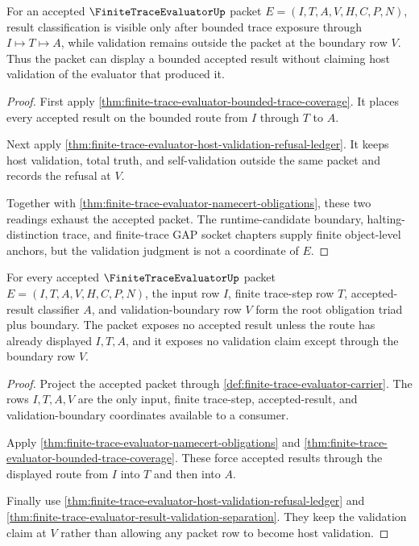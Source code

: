 \begin{theorem}
\label{thm:finite-trace-evaluator-result-validation-separation}
For an accepted $\FiniteTraceEvaluatorUp$ packet
$E=(I,T,A,V,H,C,P,N)$, result classification is visible only after bounded trace exposure through $I \longmapsto T \longmapsto A$, while validation remains outside the packet at the boundary row $V$. Thus the packet can display a bounded accepted result without claiming host validation of the evaluator that produced it.
\end{theorem}
\begin{proof}
First apply \autoref{thm:finite-trace-evaluator-bounded-trace-coverage}. It places every accepted result on the bounded route from $I$ through $T$ to $A$.

Next apply \autoref{thm:finite-trace-evaluator-host-validation-refusal-ledger}. It keeps host validation, total truth, and self-validation outside the same packet and records the refusal at $V$.

Together with \autoref{thm:finite-trace-evaluator-namecert-obligations}, these two readings exhaust the accepted packet. The runtime-candidate boundary, halting-distinction trace, and finite-trace GAP socket chapters supply finite object-level anchors, but the validation judgment is not a coordinate of $E$.
\end{proof}

\begin{theorem}
\label{thm:finite-trace-evaluator-route-obligation-triad}
For every accepted $\FiniteTraceEvaluatorUp$ packet
$E=(I,T,A,V,H,C,P,N)$, the input row $I$, finite trace-step row $T$,
accepted-result classifier $A$, and validation-boundary row $V$ form the root
obligation triad plus boundary. The packet exposes no accepted result unless
the route has already displayed $I,T,A$, and it exposes no validation claim
except through the boundary row $V$.
\end{theorem}
\begin{proof}
Project the accepted packet through
\autoref{def:finite-trace-evaluator-carrier}. The rows $I,T,A,V$ are the only
input, finite trace-step, accepted-result, and validation-boundary coordinates
available to a consumer.

Apply \autoref{thm:finite-trace-evaluator-namecert-obligations} and
\autoref{thm:finite-trace-evaluator-bounded-trace-coverage}. These force
accepted results through the displayed route from $I$ into $T$ and then into
$A$.

Finally use \autoref{thm:finite-trace-evaluator-host-validation-refusal-ledger}
and \autoref{thm:finite-trace-evaluator-result-validation-separation}. They
keep the validation claim at $V$ rather than allowing any packet row to become
host validation.
\end{proof}

